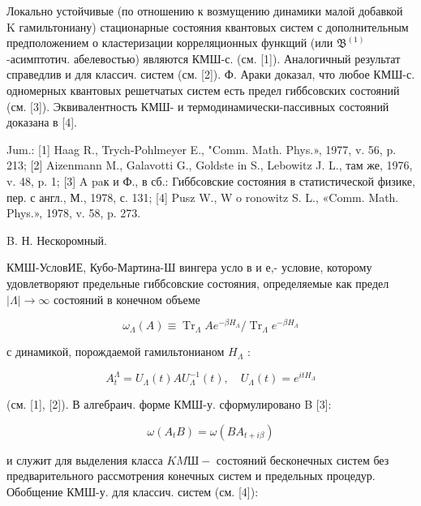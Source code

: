 \documentclass[10pt]{article}
\begin{document}
Локально устойчивые (по отношению к возмущению динамики малой добавкой $\mathrm{K}$ гамильтониану) стационарные состояния квантовых систем с дополнительным предположением о кластеризации корреляционных функщий (или $\mathfrak{B}^{(1)}$-асимптотич. абелевостью) являются КМШ-с. (см. [1]). Аналогичный результат справедлив и для классич. систем (см. [2]). Ф. Араки доказал, что любое КМШ-с. одномерных квантовых решетчатых систем есть предел гиббсовских состояний (см. [3]). Эквивалентность КМШ- и термодинамически-пассивных состояний доказана в [4].



Jum.: [1] Haag R., Trych-Pohlmeyer E., "Comm. Math. Phys.», 1977, v. 56, p. 213; [2] Aizenmann M., Galavotti G., Goldste in S., Lebowitz J. L., там же, 1976, v. 48, p. 1; [3] A paк и Ф., в сб.: Гиббсовские состояния в статистической физике, пер. с англ., М., 1978, с. 131; [4] Pusz W., W o ronowitz S. L., «Comm. Math. Phys.», 1978, v. 58, p. 273.



B. Н. Нескоромный.



КМШ-УсловИЕ, Кубо-Мартина-Ш вингера усло в и е,- условие, которому удовлетворяют предельные гиббсовские состояния, определяемые как предел $|\Lambda| \rightarrow \infty$ состояний в конечном объеме



\[

\omega_{\Lambda}(A) \equiv \operatorname{Tr}_{\Lambda} A e^{-\beta H_{\Lambda}} / \operatorname{Tr}_{\Lambda} e^{-\beta H_{\Lambda}}

\]



с динамикой, порождаемой гамильтонианом $H_{\Lambda}$ :



\[

A_{t}^{\Lambda}=U_{\Lambda}(t) A U_{\Lambda}^{-1}(t), \quad U_{\Lambda}(t)=e^{i t H_{\Lambda}}

\]



(см. [1], [2]). В алгебраич. форме КМШ-у. сформулировано B [3]:



\[

\omega\left(A_{t} B\right)=\omega\left(B A_{t+i \beta}\right)

\]



и служит для выделения класса $K M Ш-$ состояний бесконечных систем без предварительного рассмотрения конечных систем и предельных процедур. Обобщение КМШ-у. для классич. систем (см. [4]):
\end{document}
